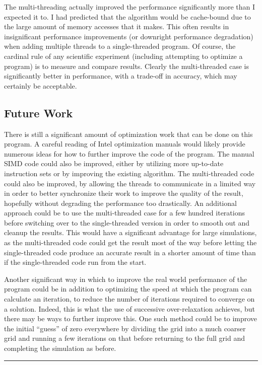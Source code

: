 The multi-threading actually improved the performance significantly more than I expected it to.
I had predicted that the algorithm would be cache-bound due to the large amount of memory accesses
that it makes. This often results in insignificant performance improvements (or downright performance
degradation) when adding multiple threads to a single-threaded program. Of course, the cardinal
rule of any scientific experiment (including attempting to optimize a program) is to measure and
compare results. Clearly the multi-threaded case is significantly better in performance, with a trade-off
in accuracy, which may certainly be acceptable.

\subsection{Future Work}

There is still a significant amount of optimization work that can be done on this program. A careful reading
of Intel optimization manuals would likely provide numerous ideas for how to further improve the code
of the program. The manual SIMD code could also be improved, either by utilizing more up-to-date instruction
sets or by improving the existing algorithm. The multi-threaded code could also be improved, by allowing the threads
to communicate in a limited way in order to better synchronize their work to improve the quality of the result, hopefully without
degrading the performance too drastically. An additional approach could be to use the multi-threaded case for
a few hundred iterations before switching over to the single-threaded version in order to smooth out and cleanup the
results. This would have a significant advantage for large simulations, as the multi-threaded code could get the result
most of the way before letting the single-threaded code produce an accurate result in a shorter amount of time than
if the single-threaded code run from the start.

Another significant way in which to improve the real world performance of the program could be in addition to optimizing
the speed at which the program can calculate an iteration, to reduce the number of iterations required to
converge on a solution. Indeed, this is what the use of successive over-relaxation achieves, but there may be ways
to further improve this. One such method could be to improve the initial ``guess'' of zero everywhere by dividing
the grid into a much coarser grid and running a few iterations on that before returning to the full grid and completing
the simulation as before.

\begin{center}\rule{2cm}{0.4pt}\end{center}

